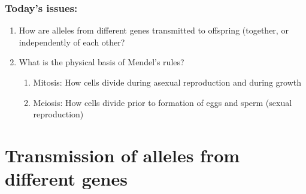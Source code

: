 \begin{noheadline}
\begin{frame}
\frametitle{Today's issues:}
\begin{enumerate}
    \item How are alleles from different genes transmitted to offspring
        (together, or independently of each other?
    \item What is the physical basis of Mendel's rules?
        \begin{enumerate}
            \item Mitosis: How cells divide during asexual reproduction and
                during growth
            \item Meiosis: How cells divide prior to formation of eggs and
                sperm (sexual reproduction)
        \end{enumerate}
\end{enumerate}
\end{frame}
\end{noheadline}

\section{Transmission of alleles from different genes}

